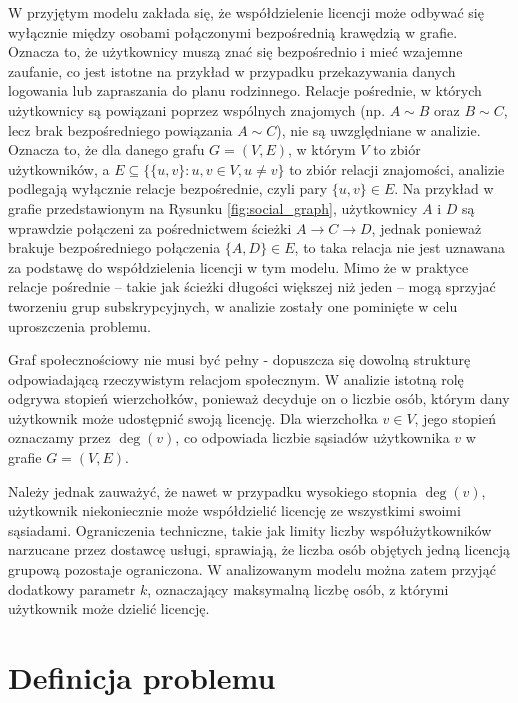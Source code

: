 W przyjętym modelu zakłada się, że współdzielenie licencji może odbywać się wyłącznie między osobami połączonymi bezpośrednią krawędzią w grafie. Oznacza to, że użytkownicy muszą znać się bezpośrednio i mieć wzajemne zaufanie, co jest istotne na przykład w przypadku przekazywania danych logowania lub zapraszania do planu rodzinnego. Relacje pośrednie, w których użytkownicy są powiązani poprzez wspólnych znajomych (np. \( A \sim B \) oraz \( B \sim C \), lecz brak bezpośredniego powiązania \( A \sim C \)), nie są uwzględniane w analizie. Oznacza to, że dla danego grafu \( G = (V, E) \), 
w którym \( V \) to zbiór użytkowników, a \( E \subseteq \{ \{u,v\} : u,v \in V, u \neq v \} \) to zbiór relacji znajomości, analizie podlegają wyłącznie relacje bezpośrednie, czyli pary \( \{u, v\} \in E \). 
Na przykład w grafie przedstawionym na Rysunku \ref{fig:social_graph}, użytkownicy \( A \) i \( D \) są wprawdzie połączeni za pośrednictwem ścieżki \( A \rightarrow C \rightarrow D \), jednak ponieważ brakuje bezpośredniego połączenia \( \{A,D\} \in E \), to taka relacja nie jest uznawana za podstawę do współdzielenia licencji w tym modelu.
Mimo że w praktyce relacje pośrednie – takie jak ścieżki długości większej niż jeden – mogą sprzyjać tworzeniu grup subskrypcyjnych, w analizie zostały one pominięte w celu uproszczenia problemu.

Graf społecznościowy nie musi być pełny - dopuszcza się dowolną strukturę odpowiadającą rzeczywistym relacjom społecznym. W analizie istotną rolę odgrywa stopień wierzchołków, ponieważ decyduje on o liczbie osób, którym dany użytkownik może udostępnić swoją licencję. Dla wierzchołka \( v \in V \), jego stopień oznaczamy przez \( \deg(v) \), co odpowiada liczbie sąsiadów użytkownika \( v \) w grafie \( G = (V, E) \).

Należy jednak zauważyć, że nawet w przypadku wysokiego stopnia \( \deg(v) \), użytkownik niekoniecznie może współdzielić licencję ze wszystkimi swoimi sąsiadami. Ograniczenia techniczne, takie jak limity liczby współużytkowników narzucane przez dostawcę usługi, sprawiają, że liczba osób objętych jedną licencją grupową pozostaje ograniczona. W analizowanym modelu można zatem przyjąć dodatkowy parametr \( k \), oznaczający maksymalną liczbę osób, z którymi użytkownik może dzielić licencję.


\section{Definicja problemu}

